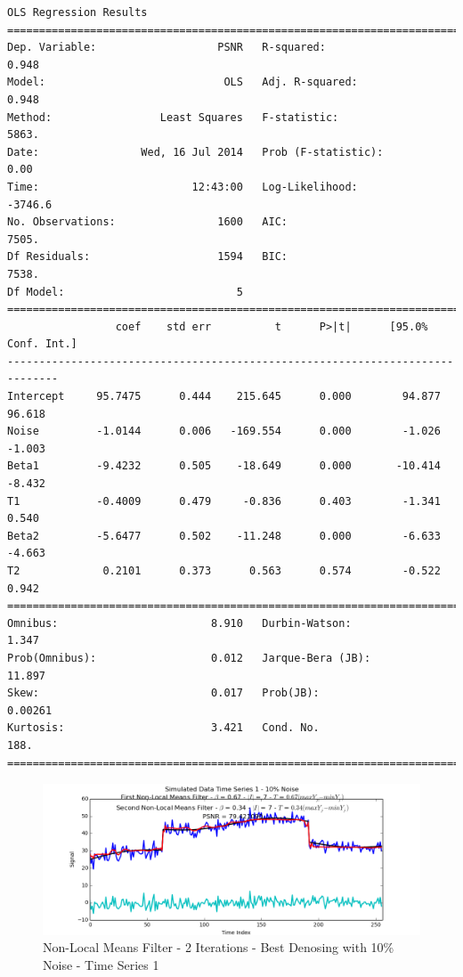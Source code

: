 \documentclass[11pt]{article}
\theoremstyle{definition}
\begin{document}
{\begin{lstlisting}[caption = Time Series 3 - Non-Local Means Filter 2 Iterations OLS Model, label = {multinlmeans3}]
                            OLS Regression Results                            
==============================================================================
Dep. Variable:                   PSNR   R-squared:                       0.948
Model:                            OLS   Adj. R-squared:                  0.948
Method:                 Least Squares   F-statistic:                     5863.
Date:                Wed, 16 Jul 2014   Prob (F-statistic):               0.00
Time:                        12:43:00   Log-Likelihood:                -3746.6
No. Observations:                1600   AIC:                             7505.
Df Residuals:                    1594   BIC:                             7538.
Df Model:                           5                                         
==============================================================================
                 coef    std err          t      P>|t|      [95.0% Conf. Int.]
------------------------------------------------------------------------------
Intercept     95.7475      0.444    215.645      0.000        94.877    96.618
Noise         -1.0144      0.006   -169.554      0.000        -1.026    -1.003
Beta1         -9.4232      0.505    -18.649      0.000       -10.414    -8.432
T1            -0.4009      0.479     -0.836      0.403        -1.341     0.540
Beta2         -5.6477      0.502    -11.248      0.000        -6.633    -4.663
T2             0.2101      0.373      0.563      0.574        -0.522     0.942
==============================================================================
Omnibus:                        8.910   Durbin-Watson:                   1.347
Prob(Omnibus):                  0.012   Jarque-Bera (JB):               11.897
Skew:                           0.017   Prob(JB):                      0.00261
Kurtosis:                       3.421   Cond. No.                         188.
==============================================================================
\end{lstlisting}
}

\begin{figure}
\centering
\includegraphics[width = 0.75 \textwidth]{MultiNLMeansSignal1Best.png}
\caption{Non-Local Means Filter - 2 Iterations - Best Denosing with 10\% Noise - Time Series 1}
\label{multinlmeans1best}
\end{figure}
\end{document}
